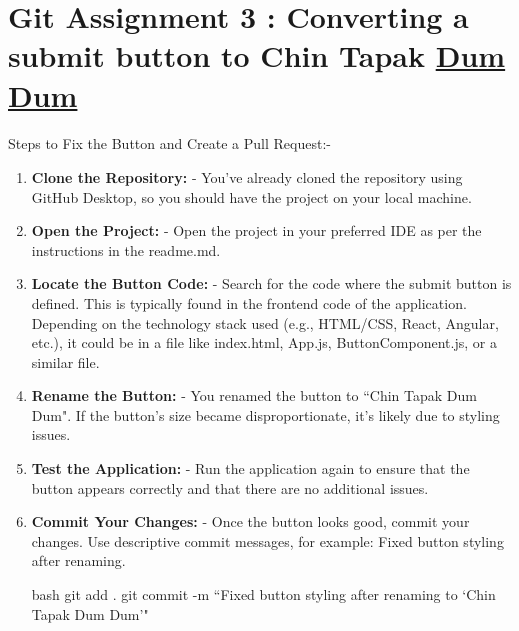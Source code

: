 \documentclass[a4paper,12pt]{article}
\begin{document}
\section*{\large{Git Assignment 3 : Converting a submit button to Chin Tapak \underline{Dum Dum}}}
\paragraph{}
\begin{flushleft}
\text{\#}Steps to Fix the Button and Create a Pull Request:-\\
\end{flushleft}
\vspace{0.5 cm}
\begin{enumerate}
\item\textbf{Clone the Repository:}
   - You’ve already cloned the repository using GitHub Desktop, so you should have the project on your local machine.\\

\item\textbf{Open the Project:}
   - Open the project in your preferred IDE as per the instructions in the readme.md.\\

\item\textbf{Locate the Button Code:}
   - Search for the code where the submit button is defined. This is typically found in the frontend code of the application. Depending on the technology stack used (e.g., HTML/CSS, React, Angular, etc.), it could be in a file like index.html, App.js, ButtonComponent.js, or a similar file.\\

\item\textbf{Rename the Button:}
   - You renamed the button to ``Chin Tapak Dum Dum". If the button’s size became disproportionate, it’s likely due to styling issues.\\

\item\textbf{Test the Application:}
   - Run the application again to ensure that the button appears correctly and that there are no additional issues.\\

\item\textbf{Commit Your Changes:}
   - Once the button looks good, commit your changes. Use descriptive commit messages, for example: Fixed button styling after renaming.

   bash
   git add .
   git commit -m ``Fixed button styling after renaming to `Chin Tapak Dum Dum'"
   \\
   

\end{enumerate}
\end{document}
